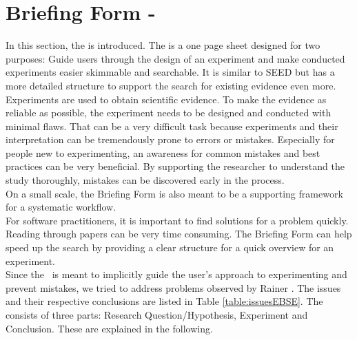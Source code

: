 
\section{Briefing Form - \briefingform}
\label{sec:briefing form}

In this section, the \textit{\briefingform} is introduced. The \briefingform is a one page sheet designed for two purposes: Guide users through the design of an experiment and make conducted experiments easier skimmable and searchable. It is similar to SEED but has a more detailed structure to support the search for existing evidence even more.\\
Experiments are used to obtain scientific evidence. To make the evidence as reliable as possible, the experiment needs to be designed and conducted with minimal flaws. That can be a very difficult task because experiments and their interpretation can be tremendously prone to errors or mistakes. Especially for people new to experimenting, an awareness for common mistakes and best practices can be very beneficial. By supporting the researcher to understand the study thoroughly, mistakes can be discovered early in the process.\\
On a small scale, the Briefing Form is also meant to be a  supporting framework for a systematic workflow.\\
For software practitioners, it is important to find solutions for a problem quickly. Reading through papers can be very time consuming. The Briefing Form can help speed up the search by providing a clear structure for a quick overview for an experiment.\\
Since the \briefingform~is meant to implicitly guide the user's approach to experimenting and prevent mistakes, we tried to address problems observed  by Rainer \etal \cite{Rainer2006}. The issues and their respective conclusions are listed in Table \ref{table:issuesEBSE}. The \briefingform consists of three parts: Research Question/Hypothesis, Experiment and Conclusion. These are explained in the following.\\

